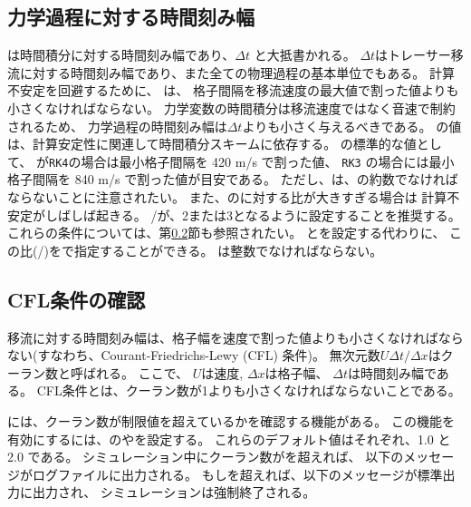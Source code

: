 \subsection{力学過程に対する時間刻み幅}

 は時間積分に対する時間刻み幅であり、$\Delta t$ と大抵書かれる。
$\Delta t$はトレーサー移流に対する時間刻み幅であり、また全ての物理過程の基本単位でもある。
計算不安定を回避するために、 は、
格子間隔を移流速度の最大値で割った値よりも小さくなければならない。
力学変数の時間積分は移流速度ではなく音速で制約されるため、
力学過程の時間刻み幅は$\Delta t$よりも小さく与えるべきである。
の値は、計算安定性に関連して時間積分スキームに依存する。
の標準的な値として、
が\verb|RK4|の場合は最小格子間隔を 420 m/s で割った値、
\verb|RK3| の場合には最小格子間隔を 840 m/s で割った値が目安である。
ただし、は、の約数でなければならないことに注意されたい。
また、のに対する比が大きすぎる場合は
計算不安定がしばしば起きる。
/が、2または3となるように設定することを推奨する。
これらの条件については、第\ref{subsec:cfl_check}節も参照されたい。
とを設定する代わりに、
この比(/)をで指定することができる。
は整数でなければならない。

\subsection{CFL条件の確認} \label{subsec:cfl_check}

移流に対する時間刻み幅は、格子幅を速度で割った値よりも小さくなければならない(すなわち、Courant-Friedrichs-Lewy (CFL) 条件)。
無次元数$U \Delta t/\Delta x$はクーラン数と呼ばれる。
ここで、 $U$は速度, $\Delta x$は格子幅、 $\Delta t$は時間刻み幅である。
CFL条件とは、クーラン数が1よりも小さくなければならないことである。

\scalerm には、クーラン数が制限値を超えているかを確認する機能がある。
この機能を有効にするには、のやを設定する。
これらのデフォルト値はそれぞれ、1.0 と 2.0 である。
シミュレーション中にクーラン数がを超えれば、
以下のメッセージがログファイルに出力される。
もしを超えれば、以下のメッセージが標準出力に出力され、
シミュレーションは強制終了される。


